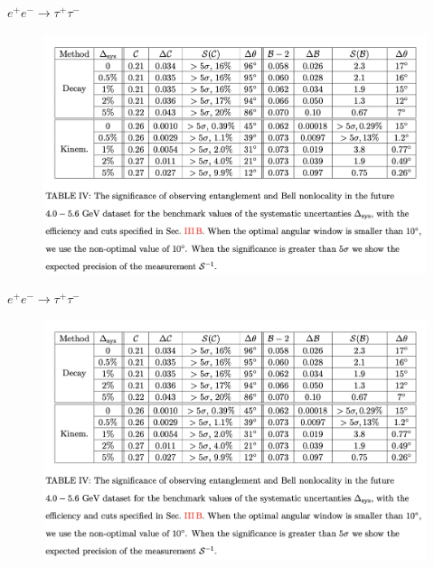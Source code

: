 \documentclass{beamer}
\begin{document}
    \begin{frame}{$e^+e^-\to \tau^+\tau^-$ \footnotesize {}}
        \begin{figure}[htbp]
            \centering
            \includegraphics[width=0.8\linewidth]{img/eetautau5.png}
        \end{figure}
    \end{frame}

    \begin{frame}{$e^+e^-\to \tau^+\tau^-$ \footnotesize {}}
        \begin{figure}[htbp]
            \centering
            \includegraphics[width=0.8\linewidth]{img/eetautau6.png}
        \end{figure}
    \end{frame}
\end{document}
